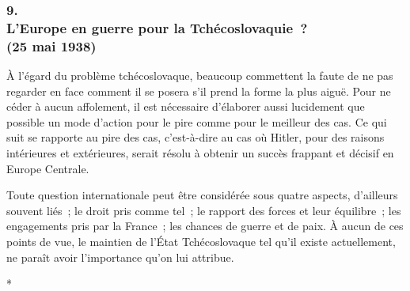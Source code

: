 \documentclass[french,twoside]{book} %
\begin{document}
\subsubsection[{9. L’Europe en guerre pour la Tchécoslovaquie ? (25 mai 1938)}]{9. \\
L’Europe en guerre pour la Tchécoslovaquie ? \\
(25 mai 1938)}
\noindent \par
À l'égard du problème tchécoslovaque, beaucoup commettent la faute de ne pas regarder en face comment il se posera s'il prend la forme la plus aiguë. Pour ne céder à aucun affolement, il est nécessaire d'élaborer aussi lucidement que possible un mode d'action pour le pire comme pour le meilleur des cas. Ce qui suit se rapporte au pire des cas, c'est-à-dire au cas où Hitler, pour des raisons intérieures et extérieures, serait résolu à obtenir un succès frappant et décisif en Europe Centrale.\par
Toute question internationale peut être considérée sous quatre aspects, d'ailleurs souvent liés ; le droit pris comme tel ; le rapport des forces et leur équilibre ; les engagements pris par la France ; les chances de guerre et de paix. À aucun de ces points de vue, le maintien de l'État Tchécoslovaque tel qu'il existe actuellement, ne paraît avoir l'importance qu'on lui attribue.\par

\begin{center}
\noindent \centerline{*}\par
\end{center}
\end{document}
